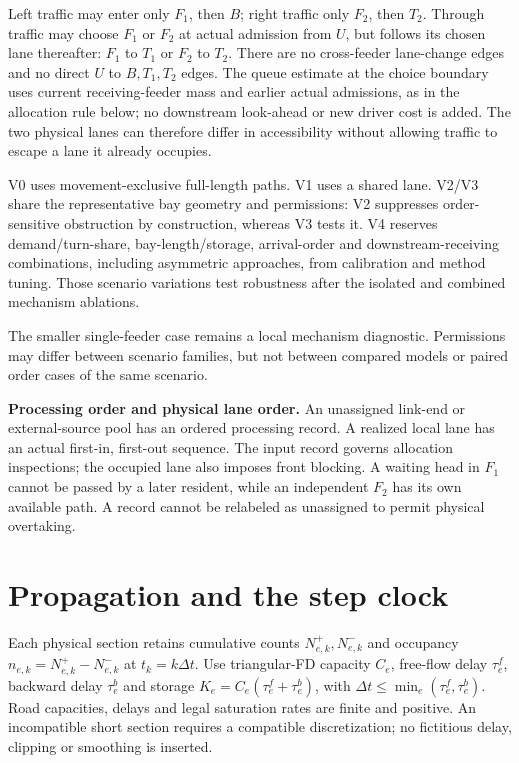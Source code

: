 \documentclass[10pt,a4paper]{article}
\newenvironment{revision}{\begingroup\color{revisionred}}{\par\endgroup}
\begin{document}
Left traffic may enter only $F_1$, then $B$; right traffic only $F_2$,
then $T_2$. Through traffic may choose $F_1$ or $F_2$ at actual admission
from $U$, but follows its chosen lane thereafter: $F_1$ to $T_1$ or
$F_2$ to $T_2$. There are no cross-feeder lane-change edges and no direct
$U$ to $B,T_1,T_2$ edges. The queue estimate at the choice boundary uses
current receiving-feeder mass and earlier actual admissions, as in the
allocation rule below; no downstream look-ahead or new driver cost is added.
The two physical lanes can therefore differ in accessibility without
allowing traffic to escape a lane it already occupies.

V0 uses movement-exclusive full-length paths. V1 uses a shared lane.
V2/V3 share the representative bay geometry and permissions: V2 suppresses
order-sensitive obstruction by construction, whereas V3 tests it.
\begin{revision}
V4 reserves demand/turn-share, bay-length/storage, arrival-order and
downstream-receiving combinations, including asymmetric approaches,
from calibration and method tuning. Those scenario variations test
robustness after the isolated and combined mechanism ablations.
\end{revision} The smaller single-feeder
case remains a local mechanism diagnostic. Permissions may differ
between scenario families, but not between compared models or paired
order cases of the same scenario.

\textbf{Processing order and physical lane order.}
An unassigned link-end or external-source pool has an ordered processing
record. A realized local lane has an actual first-in, first-out sequence.
The input record governs allocation inspections; the occupied lane also
imposes front blocking. A waiting head in $F_1$ cannot be passed by a
later resident, while an independent $F_2$ has its own available path.
A record cannot be relabeled as unassigned to permit physical overtaking.

\section{Propagation and the step clock}

Each physical section retains cumulative counts $N^+_{e,k},N^-_{e,k}$
and occupancy $n_{e,k}=N^+_{e,k}-N^-_{e,k}$ at $t_k=k\Delta t$.
Use triangular-FD capacity $C_e$, free-flow delay $\tau^f_e$, backward
delay $\tau^b_e$ and storage $K_e=C_e(\tau^f_e+\tau^b_e)$, with
$\Delta t\leq\min_e(\tau^f_e,\tau^b_e)$.
Road capacities, delays and legal saturation rates are finite and positive.
An incompatible short section requires a compatible discretization;
no fictitious delay, clipping or smoothing is inserted.
\end{document}
